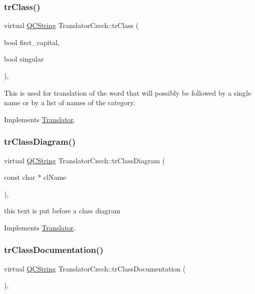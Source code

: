 \subsubsection{\texorpdfstring{trClass()}{trClass()}}
{\footnotesize\ttfamily virtual \mbox{\hyperlink{class_q_c_string}{Q\+C\+String}} Translator\+Czech\+::tr\+Class (\begin{DoxyParamCaption}\item[{bool}]{first\+\_\+capital,  }\item[{bool}]{singular }\end{DoxyParamCaption})\hspace{0.3cm}{\ttfamily [inline]}, {\ttfamily [virtual]}}

This is used for translation of the word that will possibly be followed by a single name or by a list of names of the category. 

Implements \mbox{\hyperlink{class_translator}{Translator}}.

\mbox{\label{class_translator_czech_a954f634df0ca71cd2b2efce30aa47df5}} 
\subsubsection{\texorpdfstring{trClassDiagram()}{trClassDiagram()}}
{\footnotesize\ttfamily virtual \mbox{\hyperlink{class_q_c_string}{Q\+C\+String}} Translator\+Czech\+::tr\+Class\+Diagram (\begin{DoxyParamCaption}\item[{const char $\ast$}]{cl\+Name }\end{DoxyParamCaption})\hspace{0.3cm}{\ttfamily [inline]}, {\ttfamily [virtual]}}

this text is put before a class diagram 

Implements \mbox{\hyperlink{class_translator}{Translator}}.

\mbox{\label{class_translator_czech_a09e0dff26e02efeeefa7700b0d81a5c9}} 
\subsubsection{\texorpdfstring{trClassDocumentation()}{trClassDocumentation()}}
{\footnotesize\ttfamily virtual \mbox{\hyperlink{class_q_c_string}{Q\+C\+String}} Translator\+Czech\+::tr\+Class\+Documentation (\begin{DoxyParamCaption}{ }\end{DoxyParamCaption})\hspace{0.3cm}{\ttfamily [inline]}, {\ttfamily [virtual]}}

